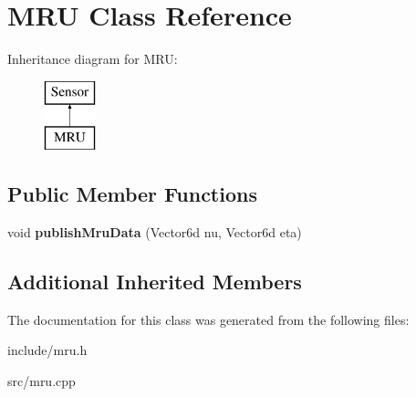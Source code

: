 \section{M\+RU Class Reference}
\label{class_m_r_u}
Inheritance diagram for M\+RU\+:\begin{figure}[H]
\begin{center}
\leavevmode
\includegraphics[height=2.000000cm]{class_m_r_u}
\end{center}
\end{figure}
\subsection*{Public Member Functions}
\begin{DoxyCompactItemize}
\item 
void {\bfseries publish\+Mru\+Data} (Vector6d nu, Vector6d eta)\label{class_m_r_u_ac3926b4ce79a4ddc075597bf8a20114e}

\end{DoxyCompactItemize}
\subsection*{Additional Inherited Members}


The documentation for this class was generated from the following files\+:\begin{DoxyCompactItemize}
\item 
include/mru.\+h\item 
src/mru.\+cpp\end{DoxyCompactItemize}
